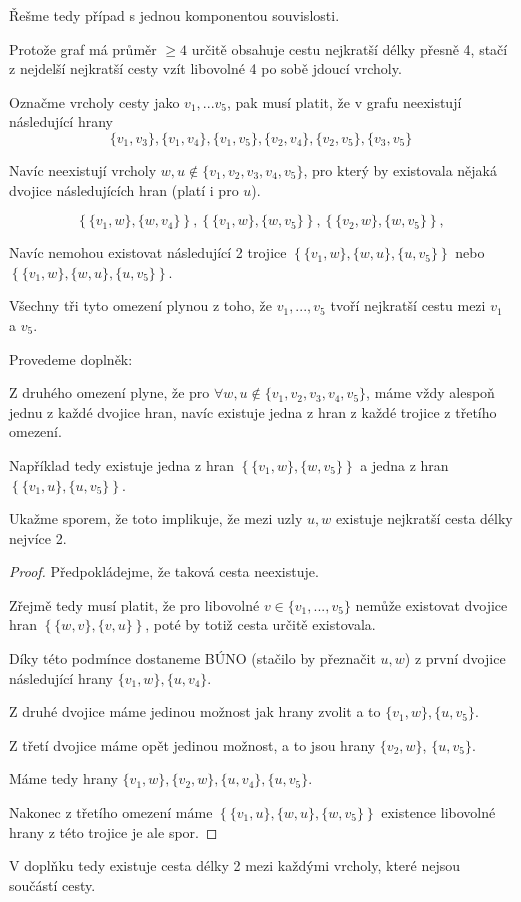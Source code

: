 \documentclass[../main.tex]{subfiles}
\begin{document}
Řešme tedy případ s jednou komponentou souvislosti.

Protože graf má průměr $\geq4$ určitě obsahuje cestu nejkratší délky přesně 4, stačí z nejdelší nejkratší cesty vzít libovolné 4 po sobě jdoucí vrcholy.

Označme vrcholy cesty jako $v_1, ... v_5$, pak musí platit, že v grafu neexistují následující hrany
\begin{equation*}
    \{v_1,v_3\},\{v_1,v_4\},\{v_1,v_5\},\{v_2,v_4\},\{v_2,v_5\},\{v_3,v_5\}
\end{equation*}

Navíc neexistují vrcholy $w,u\notin\{v_1,v_2,v_3,v_4,v_5\}$, pro který by existovala nějaká dvojice následujících hran (platí i pro $u$).

\begin{equation*}    
\left\{\{v_1, w\}, \{w, v_4\}\right\},
\left\{\{v_1, w\}, \{w, v_5\}\right\},
\left\{\{v_2, w\}, \{w, v_5\}\right\},
\end{equation*}

Navíc nemohou existovat následující 2 trojice $\left\{\{v_1, w\}, \{w,u\}, \{u, v_5\}\right\}$ nebo $\left\{\{v_1, w\}, \{w,u\}, \{u, v_5\}\right\}$.

Všechny tři tyto omezení plynou z toho, že $v_1,...,v_5$ tvoří nejkratší cestu mezi $v_1$ a $v_5$.

Provedeme  doplněk:

Z druhého omezení plyne, že pro $\forall w,u \notin \{v_1,v_2,v_3,v_4,v_5\}$,
máme vždy alespoň jednu z každé dvojice hran, navíc existuje jedna z hran z každé trojice z třetího omezení. 

Například tedy existuje  jedna z hran $\left\{\{v_1, w\}, \{w, v_5\}\right\}$ a 
jedna z hran $\left\{\{v_1, u\}, \{u, v_5\}\right\}$. 

Ukažme sporem, že toto implikuje, že mezi uzly $u,w$ existuje 
nejkratší cesta délky nejvíce 2.

\begin{proof}
    Předpokládejme, že taková cesta neexistuje.

    Zřejmě tedy musí platit, že pro libovolné $v\in\{v_1,...,v_5\}$ nemůže existovat dvojice hran $\left\{\{w,v\},\{v,u\}\right\}$, poté by totiž cesta určitě existovala.

    Díky této podmínce dostaneme BÚNO (stačilo by přeznačit $u,w$) 
    z první dvojice následující hrany $\{v_1, w\}, \{u, v_4\}$.

    Z druhé dvojice máme jedinou možnost jak hrany zvolit a to $\{v_1, w\}, \{u, v_5\}$.

    Z třetí dvojice máme opět jedinou možnost, a to jsou  hrany $\{v_2, w\}$, $\{u, v_5\}$.

    Máme tedy hrany $\{v_1, w\}, \{v_2, w\}, \{u, v_4\}, \{u, v_5\}$. 

    Nakonec z třetího omezení máme $\left\{\{v_1, u\}, \{w,u\}, \{w, v_5\}\right\}$
    existence libovolné hrany z této trojice je ale spor.
     
\end{proof}
V doplňku tedy existuje cesta délky 2 mezi každými vrcholy, které nejsou součástí cesty.
\end{document}
